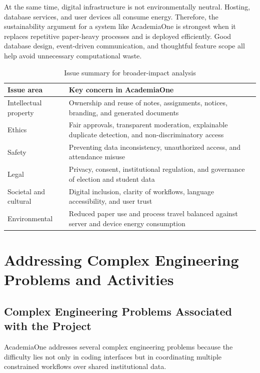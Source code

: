 \documentclass[12pt,a4paper]{report}
\newcommand{\systemName}{AcademiaOne}
\begin{document}
At the same time, digital infrastructure is not environmentally neutral. Hosting, database services, and user devices all consume energy. Therefore, the sustainability argument for a system like \systemName{} is strongest when it replaces repetitive paper-heavy processes and is deployed efficiently. Good database design, event-driven communication, and thoughtful feature scope all help avoid unnecessary computational waste.

\begin{table}[H]
  \centering
  \caption{Issue summary for broader-impact analysis}
  \label{tab:broader-issues}
  \renewcommand{\arraystretch}{1.2}
  \begin{tabularx}{\textwidth}{p{1.6in}Y}
    \toprule
    \textbf{Issue area} & \textbf{Key concern in \systemName{}} \\
    \midrule
    Intellectual property & Ownership and reuse of notes, assignments, notices, branding, and generated documents \\
    Ethics & Fair approvals, transparent moderation, explainable duplicate detection, and non-discriminatory access \\
    Safety & Preventing data inconsistency, unauthorized access, and attendance misuse \\
    Legal & Privacy, consent, institutional regulation, and governance of election and student data \\
    Societal and cultural & Digital inclusion, clarity of workflows, language accessibility, and user trust \\
    Environmental & Reduced paper use and process travel balanced against server and device energy consumption \\
    \bottomrule
  \end{tabularx}
\end{table}

\chapter{Addressing Complex Engineering Problems and Activities}

\section{Complex Engineering Problems Associated with the Project}
\systemName{} addresses several complex engineering problems because the difficulty lies not only in coding interfaces but in coordinating multiple constrained workflows over shared institutional data.
\end{document}

